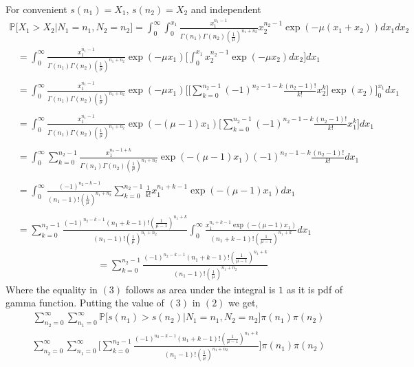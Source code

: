 \documentclass[a4paper,english,11pt]{article}
\begin{document}
For convenient $s(n_1) = X_1$, $s(n_2) = X_2$ and independent
\begin{align*}
\mathbb{P}\bigg[X_1 > X_2 | N_1 =n_1, N_2 =n_2\bigg]= \int_{0}^{\infty}\int_{0}^{x_1}\frac{x_1^{n_1-1}}{\Gamma(n_1) \Gamma(n_2)(\frac{1}{\mu})^{n_1 + n_2}}x_2^{n_2-1}\exp(-\mu(x_1+x_2))dx_1 dx_2
\end{align*}
\begin{align*}
&=\int_{0}^{\infty}\frac{x_1^{n_1-1}}{\Gamma(n_1) \Gamma(n_2)(\frac{1}{\mu})^{n_1 + n_2}}\exp(-\mu x_1)\Bigg[\int_{0}^{x_1}x_2^{n_2-1}\exp(-\mu x_2)dx_2\Bigg]dx_1\\\\
&=\int_{0}^{\infty}\frac{x_1^{n_1-1}}{\Gamma(n_1) \Gamma(n_2)(\frac{1}{\mu})^{n_1 + n_2}}\exp(-\mu x_1)\Biggl[\Bigg[\sum_{k=0}^{n_2-1}(-1)^{n_2-1-k}\frac{(n_2-1)!}{k!}x_2^k\Bigg]\exp(x_2)\Biggl]_0^{x_1}dx_1\\\\
&=\int_{0}^{\infty}\frac{x_1^{n_1-1}}{\Gamma(n_1) \Gamma(n_2)(\frac{1}{\mu})^{n_1 + n_2}}\exp(-(\mu-1) x_1)\Bigg[\sum_{k=0}^{n_2-1}(-1)^{n_2-1-k}\frac{(n_2-1)!}{k!}x_1^k\Bigg]dx_1\\\\
&=\int_{0}^{\infty}\sum_{k=0}^{n_2-1}\frac{x_1^{n_1-1+k}}{\Gamma(n_1) \Gamma(n_2)(\frac{1}{\mu})^{n_1 + n_2}}\exp(-(\mu-1) x_1)(-1)^{n_2-1-k}\frac{(n_2-1)!}{k!} dx_1\\\\
&=\int_{0}^{\infty}\frac{(-1)^{n_2-k-1}}{(n_1-1)!(\frac{1}{\mu})^{n_1+   n_2}}\sum_{k=0}^{n_2-1}\frac{1}{k!} x_1^{n_1+k-1} \exp(-(\mu-1)x_1)dx_1\\\\
&=\sum_{k=0}^{n_2-1}\frac{(-1)^{n_2-k-1}(n_1+k-1)!(\frac{1}{\mu-1})^{n_1+k}}{(n_1-1)!(\frac{1}{\mu})^{n_1+   n_2}}\int_{0}^{\infty}\frac{x_1^{n_1+k-1} \exp(-(\mu-1)x_1)}{(n_1+k-1)!(\frac{1}{\mu-1})^{n_1+k}} dx_1
\end{align*}
\begin{align}
&=\sum_{k=0}^{n_2-1}\frac{(-1)^{n_2-k-1}(n_1+k-1)!(\frac{1}{\mu-1})^{n_1+k}}{(n_1-1)!(\frac{1}{\mu})^{n_1+   n_2}}
\end{align}
Where the equality in $(3)$ follows as area under the integral is $1$ as it is pdf of gamma function.
Putting the value of $(3)$ in $(2)$ we get,
\begin{align*}
 \sum_{n_2=0}^{\infty}\sum_{n_1=0}^{\infty} \mathbb{P}\bigg[s(n_1) > s(n_2) | N_1 =n_1, N_2 =n_2\bigg] \pi(n_1) \pi(n_2)
 \end{align*}
 \begin{align*}
  \sum_{n_2=0}^{\infty}\sum_{n_1=0}^{\infty} \bigg[\sum_{k=0}^{n_2-1}\frac{(-1)^{n_2-k-1}(n_1+k-1)!(\frac{1}{\mu-1})^{n_1+k}}{(n_1-1)!(\frac{1}{\mu})^{n_1+   n_2}} \bigg] \pi(n_1) \pi(n_2)
\end{align*}
\end{document}
